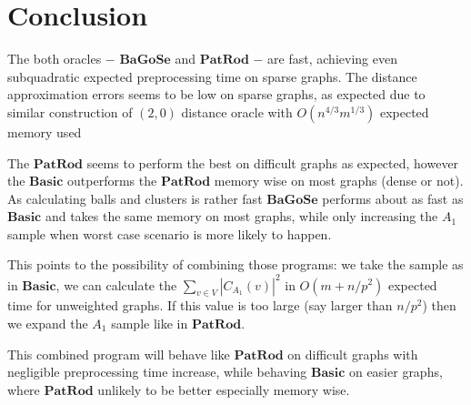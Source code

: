\documentclass[shortabstract, lic, english]{iithesis}
\theoremstyle{definition} \newtheorem{definition}{Definition}[chapter]
\theoremstyle{plain} \newtheorem{remark}[definition]{Observation}
\theoremstyle{plain} \newtheorem{theorem}[definition]{Theorem}
\theoremstyle{plain} \newtheorem{lemma}[definition]{Lemma}
\theoremstyle{plain} \newtheorem{conjecture}[definition]{Conjecture}
\begin{document}
\section{Conclusion}
The both oracles $-$ $\mathbf{BaGoSe}$ and $\mathbf{PatRod}$ $-$ are fast, achieving even subquadratic expected preprocessing time on sparse graphs.
The distance approximation errors seems to be low on sparse graphs, as expected due to similar construction of $(2,0)$ distance oracle with $O(n^{4/3}m^{1/3})$ expected memory used \cite{21OracleLessMemory}

The $\mathbf{PatRod}$ seems to perform the best on difficult graphs as expected, however the $\mathbf{Basic}$ outperforms the $\mathbf{PatRod}$ memory wise on most graphs (dense or not).
As calculating balls and clusters is rather fast $\mathbf{BaGoSe}$ performs about as fast as $\mathbf{Basic}$ and takes the same memory on most graphs, while only increasing the $A_1$ sample when worst case scenario is more likely to happen.

This points to the possibility of combining those programs:
we take the sample as in $\mathbf{Basic}$, we can calculate the $\sum_{v \in V} |C_{A_1}(v)|^2$ in $O(m + n/p^2)$ expected time for unweighted graphs.
If this value is too large (say larger than $n/p^2$) then we expand the $A_1$ sample like in $\mathbf{PatRod}$.

This combined program will behave like $\mathbf{PatRod}$ on difficult graphs with negligible preprocessing time increase,
while behaving $\mathbf{Basic}$ on easier graphs, where $\mathbf{PatRod}$ unlikely to be better especially memory wise.







\end{document}
